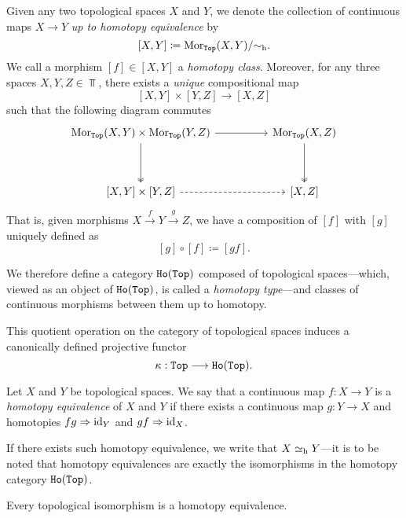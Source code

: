 Given any two topological spaces \(X\) and \(Y\), we denote the
collection of continuous maps \(X \to Y\) \emph{up to homotopy equivalence} by
\[
    [X, Y] \coloneq \operatorname{Mor}_{{\texttt{Top}}}(X, Y)/{\sim_{\text{h}}}.
\]
We call a morphism \([f] \in [X, Y]\) a \emph{homotopy class}. Moreover, for any
three spaces \(X, Y, Z \in \Top\), there exists a \emph{unique} compositional
map
\[
    [X, Y] \times [Y, Z] \longrightarrow [X, Z]
\]
such that the following diagram commutes
\[
    \begin{tikzcd}
        \Hom_{\Top}(X, Y) \times \Hom_{\Top}(Y, Z)
        \ar[rr] \ar[dd, two heads]
        &&\Hom_{\Top}(X, Z) \ar[dd, two heads]
        \\ && \\
        {[X, Y] \times [Y, Z]} \ar[rr, dashed]
        && {[X, Z]}
    \end{tikzcd}
\]
That is, given morphisms \(X \xrightarrow{f} Y \xrightarrow{g} Z\), we have a
composition of \([f]\) with \([g]\) uniquely defined as
\[
    [g] \circ [f] \coloneq [g f].
\]

\begin{definition}
    \label{def:Ho(Top)}
    We therefore define a category \({\texttt{Ho}(\texttt{Top})}\) composed of topological
    spaces---which, viewed as an object of \({\texttt{Ho}(\texttt{Top})}\), is called a \emph{homotopy
        type}---and classes of continuous morphisms between them up to homotopy.
\end{definition}

This quotient operation on the category of topological spaces induces a
canonically defined projective functor
\[
    \kappa: {\texttt{Top}} \longrightarrow {\texttt{Ho}(\texttt{Top})}.
\]

\begin{definition}
    \label{def:homotopy-equivalence}
    Let \(X\) and \(Y\) be topological spaces. We say that a continuous map
    \(f: X \to Y\) is a \emph{homotopy equivalence} of \(X\) and \(Y\) if there
    exists a continuous map \(g: Y \to X\) and homotopies \(f g \Rightarrow \operatorname{id}_Y\) and
    \(g f \Rightarrow \operatorname{id}_X\).

    If there exists such homotopy equivalence, we write that \(X \simeq_{\text{h}} Y\)---it
    is to be noted that homotopy equivalences are exactly the isomorphisms in the
    homotopy category \({\texttt{Ho}(\texttt{Top})}\).
\end{definition}

\begin{corollary}
    \label{cor:homeomorphism-is-homotopy-equivalence}
    Every topological isomorphism is a homotopy equivalence.
\end{corollary}

